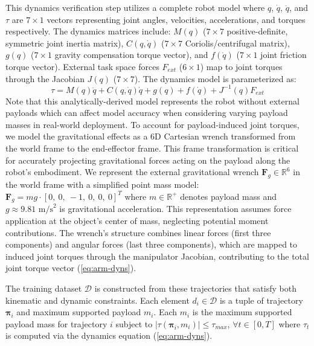 This dynamics verification step utilizes a complete robot model where $q$, $\dot{q}$, $\ddot{q}$, and $\tau$ are $7\times1$ vectors representing joint angles, velocities, accelerations, and torques respectively.
The dynamics matrices include: $M(q)$ ($7\times7$ positive-definite, symmetric joint inertia matrix), $C(q,\dot{q})$ ($7\times7$ Coriolis/centrifugal matrix), $g(q)$ ($7\times1$ gravity compensation torque vector), and $f(\dot{q})$ ($7\times1$ joint friction torque vector). External task space forces $F_{ext}$ ($6\times1$) map to joint torques through the Jacobian $J(q)$ ($7\times7$).
The dynamics model is parameterized as:
\begin{equation}\label{eq:arm-dyns}
    \tau = M(q)\ddot{q} + C(q, \dot{q})\dot{q} + g(q) + f(\dot{q}) + J^{-1}(q)F_{ext}
\end{equation}
Note that this analytically-derived model represents the robot without external payloads which can affect model accuracy when considering varying payload masses in real-world deployment.
To account for payload-induced joint torques, we model the gravitational effects as a 6D Cartesian wrench transformed from the world frame to the end-effector frame.
This frame transformation is critical for accurately projecting gravitational forces acting on the payload along the robot's embodiment.
We represent the external gravitational wrench $\bm{F}_g \in \mathbb{R}^6$ in the world frame with a simplified point mass model:
$\bm{F}_g = mg \cdot [0,\ 0,\ -1,\ 0,\ 0,\ 0]^T$
where $m \in \mathbb{R}^+$ denotes payload mass and $g \approx 9.81 \text{ m/s}^2$ is gravitational acceleration. This representation assumes force application at the object's center of mass, neglecting potential moment contributions.
The wrench's structure combines linear forces (first three components) and angular forces (last three components), which are
mapped to induced joint torques through the manipulator Jacobian, contributing to the total joint torque vector (\cref{eq:arm-dyns}).

The training dataset $\mathcal{D}$ is constructed from these trajectories that satisfy both kinematic and dynamic constraints. Each element $d_i \in \mathcal{D}$ is a tuple of trajectory $\bm{\pi}_i$ and maximum supported payload $m_i$. %
Each $m_i$ is the maximum supported payload mass for trajectory $i$ subject to $|\tau(\bm{\pi}_i, m_i)| \leq \tau_{max}$, $\forall t \in [0,T]$ where $\tau_t$ is computed via the dynamics equation (\cref{eq:arm-dyns}).
